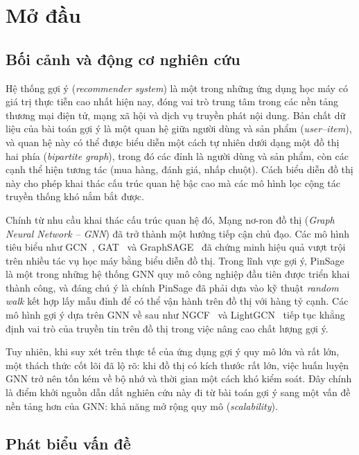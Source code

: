 \chapter{Mở đầu}
\section{Bối cảnh và động cơ nghiên cứu}

Hệ thống gợi ý (\textit{recommender system}) là một trong những ứng dụng học máy có giá trị thực tiễn cao nhất hiện nay, đóng vai trò trung tâm trong các nền tảng thương mại điện tử, mạng xã hội và dịch vụ truyền phát nội dung. Bản chất dữ liệu của bài toán gợi ý là một quan hệ giữa người dùng và sản phẩm (\textit{user--item}), và quan hệ này có thể được biểu diễn một cách tự nhiên dưới dạng một đồ thị hai phía (\textit{bipartite graph}), trong đó các đỉnh là người dùng và sản phẩm, còn các cạnh thể hiện tương tác (mua hàng, đánh giá, nhấp chuột). Cách biểu diễn đồ thị này cho phép khai thác cấu trúc quan hệ bậc cao mà các mô hình lọc cộng tác truyền thống khó nắm bắt được.

Chính từ nhu cầu khai thác cấu trúc quan hệ đó, Mạng nơ-ron đồ thị (\textit{Graph Neural Network -- GNN}) đã trở thành một hướng tiếp cận chủ đạo. Các mô hình tiêu biểu như GCN~\cite{Kipf2017}, GAT~\cite{Velickovic2018} và GraphSAGE~\cite{Hamilton2017} đã chứng minh hiệu quả vượt trội trên nhiều tác vụ học máy bằng biểu diễn đồ thị. Trong lĩnh vực gợi ý, PinSage~\cite{Ying2018PinSage} là một trong những hệ thống GNN quy mô công nghiệp đầu tiên được triển khai thành công, và đáng chú ý là chính PinSage đã phải dựa vào kỹ thuật \textit{random walk} kết hợp lấy mẫu đỉnh để có thể vận hành trên đồ thị với hàng tỷ cạnh. Các mô hình gợi ý dựa trên GNN về sau như NGCF~\cite{Wang2019NGCF} và LightGCN~\cite{He2020LightGCN} tiếp tục khẳng định vai trò của truyền tin trên đồ thị trong việc nâng cao chất lượng gợi ý.

Tuy nhiên, khi suy xét trên thực tế của ứng dụng gợi ý quy mô lớn và rất lớn, một thách thức cốt lõi đã lộ rõ: khi đồ thị có kích thước rất lớn, việc huấn luyện GNN trở nên tốn kém về bộ nhớ và thời gian một cách khó kiểm soát. Đây chính là điểm khởi nguồn dẫn dắt nghiên cứu này đi từ bài toán gợi ý sang một vấn đề nền tảng hơn của GNN: khả năng mở rộng quy mô (\textit{scalability}).

\section{Phát biểu vấn đề}

